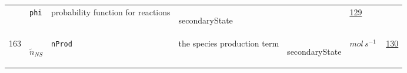 \begin{longtable}{|p{1cm}|p{2.5cm}|p{4.5cm}|p{8cm}|p{3.0cm}|p{3cm}|p{1cm}|}
             & \verb|phi|
             & probability function for reactions
             & \begin{lay}secondaryState \end{lay}
             & $  $
             & \hyperlink{"e:129"}{ 129 }
                 \\
    163
             & \hypertarget{"v:163"}{ $ {\tilde{n}}{_{{N S}}} $}
             & \verb|nProd|
             & the species production term
             & \begin{lay}secondaryState \end{lay}
             & $ mol \,s^{-1} \, $
             & \hyperlink{"e:130"}{ 130 }
                 \\
    \end{longtable}